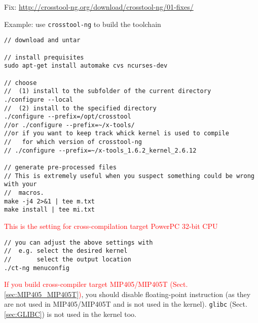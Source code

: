 Fix: \url{http://crosstool-ng.org/download/crosstool-ng/01-fixes/}

Example: use \verb!crosstool-ng! to build the toolchain
\begin{verbatim}
// download and untar

// install prequisites
sudo apt-get install automake cvs ncurses-dev

// choose
//  (1) install to the subfolder of the current directory
./configure --local
//  (2) install to the specified directory
./configure --prefix=/opt/crosstool
//or ./configure --prefix=~/x-tools/
//or if you want to keep track whick kernel is used to compile
//   for which version of crosstool-ng
// ./configure --prefix=~/x-tools_1.6.2_kernel_2.6.12

// generate pre-processed files
// This is extremely useful when you suspect something could be wrong with your
//  macros.
make -j4 2>&1 | tee m.txt
make install | tee mi.txt

\end{verbatim}

\textcolor{red}{This is the setting for cross-compilation target PowerPC 32-bit CPU}
\begin{verbatim}
// you can adjust the above settings with
//  e.g. select the desired kernel
//       select the output location
./ct-ng menuconfig
\end{verbatim}

\textcolor{red}{If you build cross-compiler target MIP405/MIP405T
(Sect.\ref{sec:MIP405_MIP405T})}, you should disable floating-point
instruction (as they are not used in MIP405/MIP405T and is not used in the
kernel). \verb!glibc! (Sect.\ref{sec:GLIBC}) is not used in the kernel too.
  

